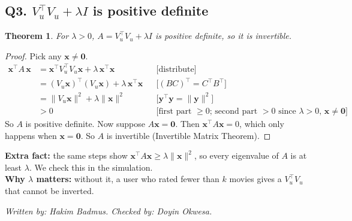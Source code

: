 \documentclass[11pt]{article}
\newtheorem{theorem}{Theorem}
\theoremstyle{definition}
\newcommand{\checked}[2]{\par\smallskip\noindent\textit{Written by: #1. \quad Checked by: #2.}\par}
\begin{document}
\subsection*{Q3. $V_u^\top V_u+\lambda I$ is positive definite}
\begin{theorem}
For $\lambda>0$, $A=V_u^\top V_u+\lambda I$ is positive definite, so it is invertible.
\end{theorem}
\begin{proof}
Pick any $\mathbf x\neq\mathbf 0$.
\begin{align*}
\mathbf x^\top A\,\mathbf x&=\mathbf x^\top V_u^\top V_u\mathbf x+\lambda\,\mathbf x^\top\mathbf x && \text{[distribute]}\\
&=(V_u\mathbf x)^\top(V_u\mathbf x)+\lambda\,\mathbf x^\top\mathbf x && \text{[$(BC)^\top=C^\top B^\top$]}\\
&=\|V_u\mathbf x\|^2+\lambda\|\mathbf x\|^2 && \text{[$\mathbf y^\top\mathbf y=\|\mathbf y\|^2$]}\\
&>0 && \text{[first part $\ge0$; second part $>0$ since $\lambda>0$, $\mathbf x\ne\mathbf 0$]}
\end{align*}
So $A$ is positive definite. Now suppose $A\mathbf x=\mathbf 0$. Then $\mathbf x^\top A\mathbf x=0$, which only happens when $\mathbf x=\mathbf 0$. So $A$ is invertible (Invertible Matrix Theorem).
\end{proof}
\noindent\textbf{Extra fact:} the same steps show $\mathbf x^\top A\mathbf x\ge\lambda\|\mathbf x\|^2$, so every eigenvalue of $A$ is at least $\lambda$. We check this in the simulation.\\
\textbf{Why $\lambda$ matters:} without it, a user who rated fewer than $k$ movies gives a $V_u^\top V_u$ that cannot be inverted.
\checked{Hakim Badmus}{Doyin Okwesa}
\end{document}
